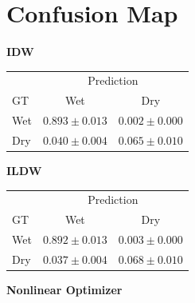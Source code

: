 \documentclass[11pt]{article}
\begin{document}
\section*{Confusion Map}
\begin{table}[H]
  \centering
  \begin{minipage}[t]{0.31\textwidth}
    \centering
    \textbf{IDW}

    \vspace{0.35em}
    \scriptsize
    \begin{tabular}{lcc}
      \toprule
       & \multicolumn{2}{c}{Prediction} \\
      GT & Wet & Dry \\
      \midrule
      Wet & $0.893 \pm 0.013$ & $0.002 \pm 0.000$ \\
      Dry & $0.040 \pm 0.004$ & $0.065 \pm 0.010$ \\
      \bottomrule
    \end{tabular}
  \end{minipage}
  \hfill
  \begin{minipage}[t]{0.31\textwidth}
    \centering
    \textbf{ILDW}

    \vspace{0.35em}
    \scriptsize
    \begin{tabular}{lcc}
      \toprule
       & \multicolumn{2}{c}{Prediction} \\
      GT & Wet & Dry \\
      \midrule
      Wet & $0.892 \pm 0.013$ & $0.003 \pm 0.000$ \\
      Dry & $0.037 \pm 0.004$ & $0.068 \pm 0.010$ \\
      \bottomrule
    \end{tabular}
  \end{minipage}
  \hfill
  \begin{minipage}[t]{0.31\textwidth}
    \centering
    \textbf{Nonlinear Optimizer}


\end{minipage}
\end{table}
\end{document}

